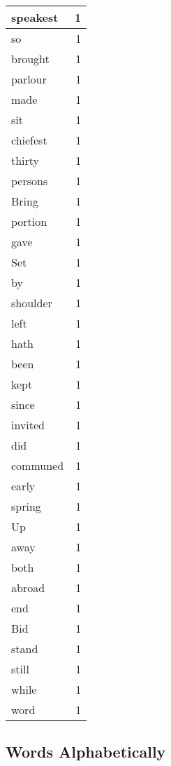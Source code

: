 \begin{center}
\begin{longtable}{l|r}
speakest & 1 \\ \hline
so & 1 \\ \hline
brought & 1 \\ \hline
parlour & 1 \\ \hline
made & 1 \\ \hline
sit & 1 \\ \hline
chiefest & 1 \\ \hline
thirty & 1 \\ \hline
persons & 1 \\ \hline
Bring & 1 \\ \hline
portion & 1 \\ \hline
gave & 1 \\ \hline
Set & 1 \\ \hline
by & 1 \\ \hline
shoulder & 1 \\ \hline
left & 1 \\ \hline
hath & 1 \\ \hline
been & 1 \\ \hline
kept & 1 \\ \hline
since & 1 \\ \hline
invited & 1 \\ \hline
did & 1 \\ \hline
communed & 1 \\ \hline
early & 1 \\ \hline
spring & 1 \\ \hline
Up & 1 \\ \hline
away & 1 \\ \hline
both & 1 \\ \hline
abroad & 1 \\ \hline
end & 1 \\ \hline
Bid & 1 \\ \hline
stand & 1 \\ \hline
still & 1 \\ \hline
while & 1 \\ \hline
word & 1 \\ \hline
\end{longtable}
\end{center}



\normalsize



\subsection{Words Alphabetically}

